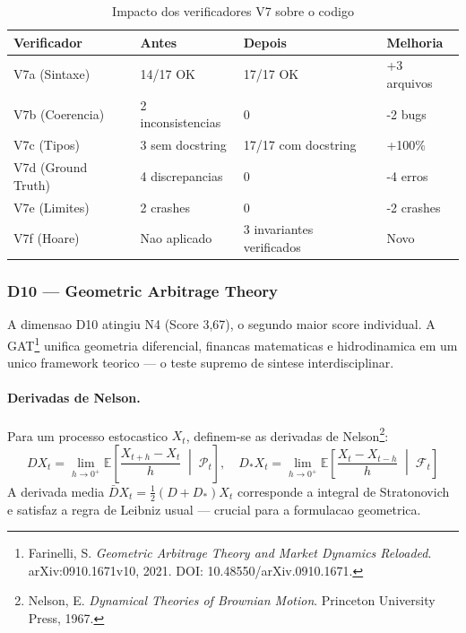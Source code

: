 \begin{table}[H]\centering\footnotesize
\caption{Impacto dos verificadores V7 sobre o codigo}
\label{tab:v7-impact}
\begin{tabular}{p{}p{}p{}p{}}
\toprule
\textbf{Verificador} & \textbf{Antes} & \textbf{Depois} & \textbf{Melhoria} \\
\midrule
V7a (Sintaxe) & 14/17 OK & 17/17 OK & +3 arquivos \\
V7b (Coerencia) & 2 inconsistencias & 0 & -2 bugs \\
V7c (Tipos) & 3 sem docstring & 17/17 com docstring & +100\% \\
V7d (Ground Truth) & 4 discrepancias & 0 & -4 erros \\
V7e (Limites) & 2 crashes & 0 & -2 crashes \\
V7f (Hoare) & Nao aplicado & 3 invariantes verificados & Novo \\
\bottomrule
\end{tabular}
\end{table}

\subsubsection{D10 --- Geometric Arbitrage Theory}

A dimensao D10 atingiu N4 (Score 3,67), o segundo maior score individual.
A GAT\footnote{Farinelli, S. \textit{Geometric Arbitrage Theory and Market
Dynamics Reloaded}. arXiv:0910.1671v10, 2021. DOI: 10.48550/arXiv.0910.1671.}
unifica geometria diferencial, financas matematicas e hidrodinamica em um
unico framework teorico --- o teste supremo de sintese interdisciplinar.

\paragraph{Derivadas de Nelson.}

Para um processo estocastico $X_t$, definem-se as derivadas de
Nelson\footnote{Nelson, E. \textit{Dynamical Theories of Brownian Motion}.
Princeton University Press, 1967.}:
\[
DX_t = \lim_{h \to 0^+} \mathbb{E}\left[\frac{X_{t+h} - X_t}{h}
\;\middle|\; \mathcal{P}_t\right], \quad
D_*X_t = \lim_{h \to 0^+} \mathbb{E}\left[\frac{X_t - X_{t-h}}{h}
\;\middle|\; \mathcal{F}_t\right]
\]
A derivada media $\bar{D}X_t = \frac{1}{2}(D + D_*)X_t$ corresponde a
integral de Stratonovich e satisfaz a regra de Leibniz usual --- crucial
para a formulacao geometrica.


